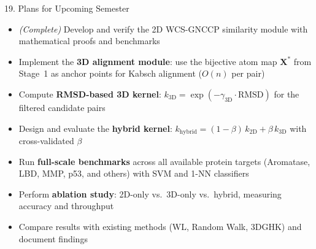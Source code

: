 \documentclass[aspectratio=169, 11pt]{beamer}
\begin{document}
\begin{frame}{19. Plans for Upcoming Semester}
\small
\begin{itemize}

\item[\checkmark] \textit{(Complete)} Develop and verify the 2D WCS-GNCCP similarity module with mathematical proofs and benchmarks

\item Implement the \textbf{3D alignment module}: use the bijective atom map $\mathbf{X}^*$ from Stage~1 as anchor points for Kabsch alignment ($O(n)$ per pair)

\item Compute \textbf{RMSD-based 3D kernel}: $k_{\text{3D}} = \exp(-\gamma_{\text{3D}} \cdot \text{RMSD})$ for the filtered candidate pairs

\item Design and evaluate the \textbf{hybrid kernel}: $k_{\text{hybrid}} = (1{-}\beta)\,k_{\text{2D}} + \beta\,k_{\text{3D}}$ with cross-validated $\beta$

\item Run \textbf{full-scale benchmarks} across all available protein targets (Aromatase, LBD, MMP, p53, and others) with SVM and 1-NN classifiers

\item Perform \textbf{ablation study}: 2D-only vs.\ 3D-only vs.\ hybrid, measuring accuracy and throughput

\item Compare results with existing methods (WL, Random Walk, 3DGHK) and document findings

\end{itemize}
\end{frame}
\end{document}
